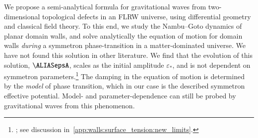 

\newcommand{\wallsep}{\ALIASwallsep}
\newcommand\hpA{\ALIAShpA}
\newcommand\hpB{\ALIAShpB}
\newcommand\hpC{\ALIAShpC}
\newcommand\hpAB{\ALIAShpAB}
\newcommand\hpCR{\ALIAShpCR}
\newcommand\hpCI{\ALIAShpCI}
\newcommand\epsA{\ALIASepsA}
\newcommand\epsB{\ALIASepsB}
\newcommand\epsC{\ALIASepsC}









We propose a semi-analytical formula for gravitational waves from two-dimensional topological defects in an FLRW universe, using differential geometry and classical field theory. 
To this end, we study the Nambu--Goto dynamics of planar domain walls, and solve analytically the equation of motion for domain walls \emph{during} a symmetron phase-transition in a matter-dominated universe. 
We have not found this solution in other literature. We find that the evolution of this solution, $\epsA$, scales as the initial amplitude $\varepsilon_\ast$, and is not dependent on symmetron parameters.\footnote{; see discussion in~\cref{app:walls:surface_tension:new_limits}.} The damping in the equation of motion is determined by the \emph{model} of phase transition, which in our case is the described symmetron effective potential. Model- and parameter-dependence can still be probed by gravitational waves from this phenomenon. 



